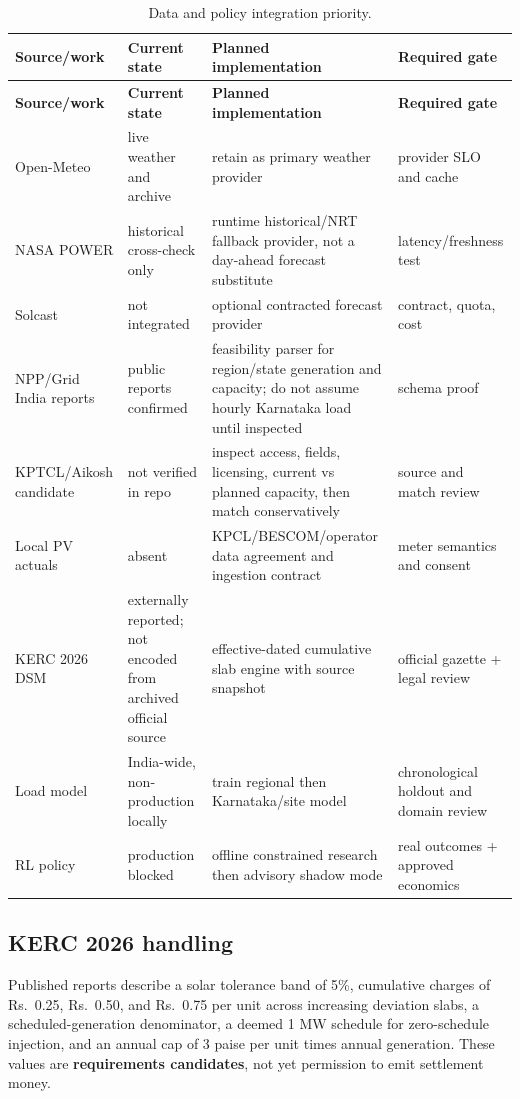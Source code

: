 \begin{longtable}{@{}L{3.0cm}L{3.0cm}L{5.0cm}L{3.5cm}@{}}
\caption{Data and policy integration priority.}\label{tab:sourcesplan}\\
\toprule
\textbf{Source/work} & \textbf{Current state} & \textbf{Planned implementation} &
\textbf{Required gate}\\
\midrule
\endfirsthead
\toprule
\textbf{Source/work} & \textbf{Current state} & \textbf{Planned implementation} &
\textbf{Required gate}\\
\midrule
\endhead
\bottomrule
\endfoot
Open-Meteo & live weather and archive & retain as primary weather provider &
provider SLO and cache\\
NASA POWER & historical cross-check only & runtime historical/NRT fallback provider,
not a day-ahead forecast substitute & latency/freshness test\\
Solcast & not integrated & optional contracted forecast provider & contract, quota, cost\\
NPP/Grid India reports & public reports confirmed & feasibility parser for region/state
generation and capacity; do not assume hourly Karnataka load until inspected & schema proof\\
KPTCL/Aikosh candidate & not verified in repo & inspect access, fields, licensing, current vs
planned capacity, then match conservatively & source and match review\\
Local PV actuals & absent & KPCL/BESCOM/operator data agreement and ingestion contract &
meter semantics and consent\\
KERC 2026 DSM & externally reported; not encoded from archived official source &
effective-dated cumulative slab engine with source snapshot & official gazette + legal review\\
Load model & India-wide, non-production locally & train regional then Karnataka/site model &
chronological holdout and domain review\\
RL policy & production blocked & offline constrained research then advisory shadow mode &
real outcomes + approved economics\\
\end{longtable}

\subsection{KERC 2026 handling}

Published reports describe a solar tolerance band of 5\%, cumulative charges of Rs.~0.25,
Rs.~0.50, and Rs.~0.75 per unit across increasing deviation slabs, a scheduled-generation
denominator, a deemed 1 MW schedule for zero-schedule injection, and an annual cap of 3 paise
per unit times annual generation. These values are \textbf{requirements candidates}, not yet
permission to emit settlement money.

